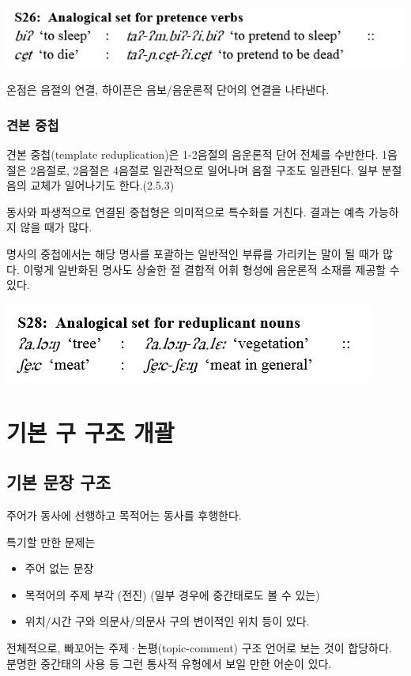 \includegraphics{Pacoh/src/PacohS26.png}

온점은 음절의 연결, 하이픈은 음보/음운론적 단어의 연결을 나타낸다.

\subsubsection{견본 중첩}
견본 중첩(template reduplication)은 1-2음절의 음운론적 단어 전체를 수반한다. 1음절은 2음절로, 2음절은 4음절로 일관적으로 일어나며
음절 구조도 일관된다. 일부 분절음의 교체가 일어나기도 한다.(2.5.3)

동사와 파생적으로 연결된 중첩형은 의미적으로 특수화를 거친다. 결과는 예측 가능하지 않을 때가 많다. 

명사의 중첩에서는 해당 명사를 포괄하는 일반적인 부류를 가리키는 말이 될 때가 많다. 이렇게 일반화된 명사도 상술한 절 결합적 어휘 형성에 음운론적 소재를 제공할 수 있다.

\includegraphics{Pacoh/src/PacohS28.png}

\section{기본 구 구조 개괄}
\subsection{기본 문장 구조}
주어가 동사에 선행하고 목적어는 동사를 후행한다.

특기할 만한 문제는 
\begin{itemize}
\item 주어 없는 문장
\item 목적어의 주제 부각 (전진) (일부 경우에 중간태로도 볼 수 있는)
\item 위치/시간 구와 의문사/의문사 구의 변이적인 위치 등이 있다.
\end{itemize}

전체적으로, 빠꼬어는 주제·논평(topic-comment) 구조 언어로 보는 것이 합당하다. 분명한 중간태의 사용 등 그런 통사적 유형에서 보일 만한 어순이 있다.

